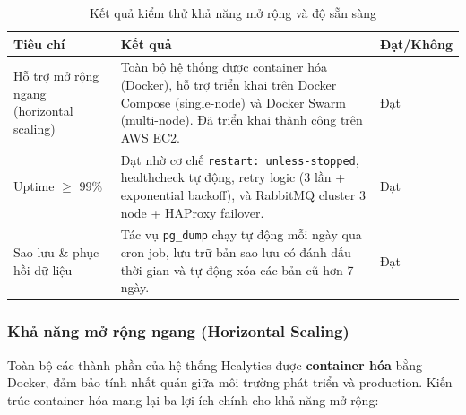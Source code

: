 \begin{table}[H]
\centering
\begin{tabularx}{\textwidth}{|p{}|X|p{}|}
\hline
\textbf{Tiêu chí} & \textbf{Kết quả} & \textbf{Đạt/Không} \\
\hline
Hỗ trợ mở rộng ngang (horizontal scaling) & Toàn bộ hệ thống được container hóa (Docker), hỗ trợ triển khai trên Docker Compose (single-node) và Docker Swarm (multi-node). Đã triển khai thành công trên AWS EC2. & Đạt \\
\hline
Uptime $\geq$ 99\% & Đạt nhờ cơ chế \texttt{restart: unless-stopped}, healthcheck tự động, retry logic (3 lần + exponential backoff), và RabbitMQ cluster 3 node + HAProxy failover. & Đạt \\
\hline
Sao lưu \& phục hồi dữ liệu & Tác vụ \texttt{pg\_dump} chạy tự động mỗi ngày qua cron job, lưu trữ bản sao lưu có đánh dấu thời gian và tự động xóa các bản cũ hơn 7 ngày. & Đạt \\
\hline
\end{tabularx}
\caption{Kết quả kiểm thử khả năng mở rộng và độ sẵn sàng}
\end{table}

\subsubsection{Khả năng mở rộng ngang (Horizontal Scaling)}

Toàn bộ các thành phần của hệ thống Healytics được \textbf{container hóa} bằng Docker, đảm bảo tính nhất quán giữa môi trường phát triển và production. Kiến trúc container hóa mang lại ba lợi ích chính cho khả năng mở rộng:

